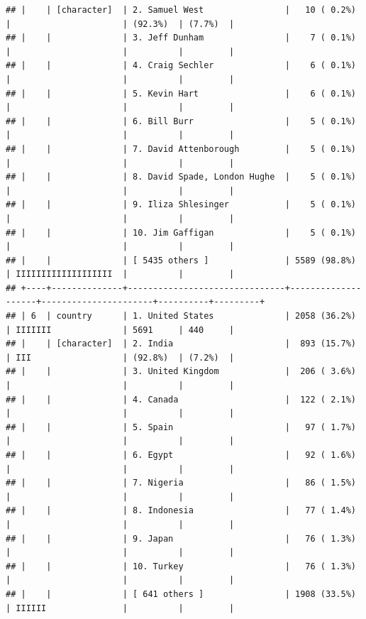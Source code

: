 \documentclass[11pt,preprint]{elsarticle}
\numberwithin{equation}{section}
\numberwithin{figure}{section}
\numberwithin{table}{section}
\begin{document}
\begin{verbatim}
## |    | [character]  | 2. Samuel West                |   10 ( 0.2%)       |                      | (92.3%)  | (7.7%)  |
## |    |              | 3. Jeff Dunham                |    7 ( 0.1%)       |                      |          |         |
## |    |              | 4. Craig Sechler              |    6 ( 0.1%)       |                      |          |         |
## |    |              | 5. Kevin Hart                 |    6 ( 0.1%)       |                      |          |         |
## |    |              | 6. Bill Burr                  |    5 ( 0.1%)       |                      |          |         |
## |    |              | 7. David Attenborough         |    5 ( 0.1%)       |                      |          |         |
## |    |              | 8. David Spade, London Hughe  |    5 ( 0.1%)       |                      |          |         |
## |    |              | 9. Iliza Shlesinger           |    5 ( 0.1%)       |                      |          |         |
## |    |              | 10. Jim Gaffigan              |    5 ( 0.1%)       |                      |          |         |
## |    |              | [ 5435 others ]               | 5589 (98.8%)       | IIIIIIIIIIIIIIIIIII  |          |         |
## +----+--------------+-------------------------------+--------------------+----------------------+----------+---------+
## | 6  | country      | 1. United States              | 2058 (36.2%)       | IIIIIII              | 5691     | 440     |
## |    | [character]  | 2. India                      |  893 (15.7%)       | III                  | (92.8%)  | (7.2%)  |
## |    |              | 3. United Kingdom             |  206 ( 3.6%)       |                      |          |         |
## |    |              | 4. Canada                     |  122 ( 2.1%)       |                      |          |         |
## |    |              | 5. Spain                      |   97 ( 1.7%)       |                      |          |         |
## |    |              | 6. Egypt                      |   92 ( 1.6%)       |                      |          |         |
## |    |              | 7. Nigeria                    |   86 ( 1.5%)       |                      |          |         |
## |    |              | 8. Indonesia                  |   77 ( 1.4%)       |                      |          |         |
## |    |              | 9. Japan                      |   76 ( 1.3%)       |                      |          |         |
## |    |              | 10. Turkey                    |   76 ( 1.3%)       |                      |          |         |
## |    |              | [ 641 others ]                | 1908 (33.5%)       | IIIIII               |          |         |

\end{verbatim}
\end{document}

